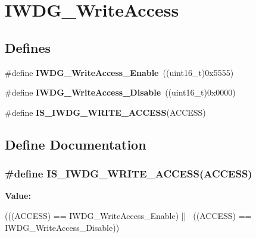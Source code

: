 \hypertarget{group__IWDG__WriteAccess}{
\section{IWDG\_\-WriteAccess}
\label{group__IWDG__WriteAccess}
}
\subsection*{Defines}
\begin{DoxyCompactItemize}
\item 
\hypertarget{group__IWDG__WriteAccess_ga86f4b926f4351e19ea069f98c2e65f91}{
\#define {\bfseries IWDG\_\-WriteAccess\_\-Enable}~((uint16\_\-t)0x5555)}
\label{group__IWDG__WriteAccess_ga86f4b926f4351e19ea069f98c2e65f91}

\item 
\hypertarget{group__IWDG__WriteAccess_ga4b395cf5b2d7ab18fc71a5f779f758cc}{
\#define {\bfseries IWDG\_\-WriteAccess\_\-Disable}~((uint16\_\-t)0x0000)}
\label{group__IWDG__WriteAccess_ga4b395cf5b2d7ab18fc71a5f779f758cc}

\item 
\#define {\bfseries IS\_\-IWDG\_\-WRITE\_\-ACCESS}(ACCESS)
\end{DoxyCompactItemize}


\subsection{Define Documentation}
\hypertarget{group__IWDG__WriteAccess_gaa89c93332f5977175f8d416b7492de18}{
\subsubsection[{IS\_\-IWDG\_\-WRITE\_\-ACCESS}]{\setlength{\rightskip}{0pt plus 5cm}\#define IS\_\-IWDG\_\-WRITE\_\-ACCESS(ACCESS)}}
\label{group__IWDG__WriteAccess_gaa89c93332f5977175f8d416b7492de18}
{\bfseries Value:}
\begin{DoxyCode}
(((ACCESS) == IWDG_WriteAccess_Enable) || \
                                      ((ACCESS) == IWDG_WriteAccess_Disable))
\end{DoxyCode}
